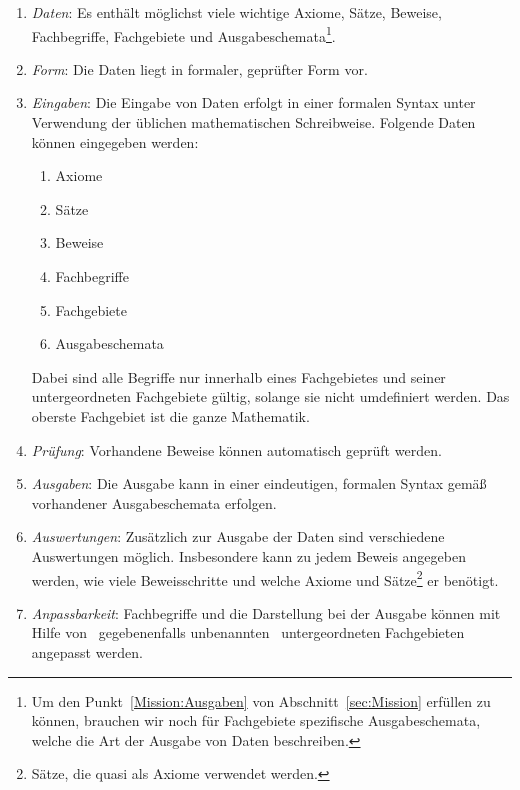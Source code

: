 \documentclass[english,ngerman,parskip=half,headsepline,footsepline]{scrreprt}
\begin{document}
	\begin{enumerate}
		\item \label{Ziel:Daten} \emph{Daten}: Es enthält möglichst viele wichtige Axiome, Sätze, Beweise, Fachbegriffe, Fachgebiete und Ausgabeschemata\footnote{ Um den Punkt~\vref{Mission:Ausgaben} von Abschnitt~\vref{sec:Mission} erfüllen zu können, brauchen wir noch für Fachgebiete spezifische Ausgabeschemata, welche die Art der Ausgabe von Daten beschreiben.}.
		
		\item \label{Ziel:Form} \emph{Form}: Die Daten liegt in formaler, geprüfter Form vor.
		
		\item \label{Ziel:Eingaben} \emph{Eingaben}: Die Eingabe von Daten erfolgt in einer formalen Syntax unter Verwendung der üblichen mathematischen Schreibweise. Folgende Daten können eingegeben werden:
		\begin{enumerate}
			\item Axiome
			\item Sätze
			\item Beweise
			\item Fachbegriffe
			\item Fachgebiete
			\item Ausgabeschemata
		\end{enumerate}
		Dabei sind alle Begriffe nur innerhalb eines Fachgebietes und seiner untergeordneten Fachgebiete gültig, solange sie nicht umdefiniert werden. Das oberste Fachgebiet ist die ganze Mathematik.
		
		\item \label{Ziel:Prüfung} \emph{Prüfung}: Vorhandene Beweise können automatisch geprüft werden.
		
		\item \label{Ziel:Ausgaben} \emph{Ausgaben}: Die Ausgabe kann in einer eindeutigen, formalen Syntax gemäß vorhandener Ausgabeschemata erfolgen.
		
		\item \label{Ziel:Auswertungen} \emph{Auswertungen}: Zusätzlich zur Ausgabe der Daten sind verschiedene Auswertungen möglich. Insbesondere kann zu jedem Beweis angegeben werden, wie viele Beweisschritte und welche Axiome und Sätze\footnote{ Sätze, die quasi als Axiome verwendet werden.} er benötigt.
		
		\item \label{Ziel:Anpassbarkeit} \emph{Anpassbarkeit}: Fachbegriffe und die Darstellung bei der Ausgabe können mit Hilfe von \textendash\ gegebenenfalls unbenannten \textendash\ untergeordneten Fachgebieten angepasst werden.
		

\end{enumerate}
\end{document}
